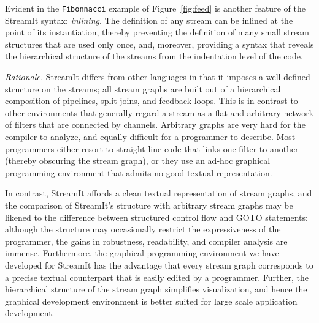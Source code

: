 Evident in the \texttt{Fibonnacci} example of Figure~\ref{fig:feed} is
another  feature   of  the  StreamIt   syntax:  \emph{inlining}.   The
definition  of  any  stream  can  be  inlined  at  the  point  of  its
instantiation, thereby preventing the  definition of many small stream
structures that are used only  once, and, moreover, providing a syntax
that  reveals  the hierarchical  structure  of  the  streams from  the
indentation level of the code.

\emph{Rationale.}  StreamIt differs from other languages in that it
imposes a well-defined structure on the streams; all stream graphs are
built out of a hierarchical composition of pipelines, split-joins, and
feedback  loops.   This is  in  contrast  to  other environments  that
generally regard a  stream as a flat and  arbitrary network of filters
that are  connected by channels.   Arbitrary graphs are very  hard for
the compiler  to analyze,  and equally difficult  for a  programmer to
describe.  Most  programmers either resort to  straight-line code that
links one filter  to another (thereby obscuring the  stream graph), or
they use  an ad-hoc graphical  programming environment that  admits no
good textual representation.

In contrast, StreamIt affords a clean textual representation of stream
graphs,  and the  comparison  of StreamIt's  structure with  arbitrary
stream  graphs may  be likened  to the  difference  between structured
control  flow  and  GOTO   statements:  although  the  structure  may
occasionally restrict the expressiveness  of the programmer, the gains
in  robustness,  readability,   and  compiler  analysis  are  immense.
Furthermore, the  graphical programming environment  we have developed
for StreamIt has the advantage  that every stream graph corresponds to
a precise textual  counterpart that is easily edited  by a programmer.
Further,  the hierarchical  structure of  the stream  graph simplifies
visualization,  and  hence  the  graphical development  environment  is
better suited for large scale application development.


